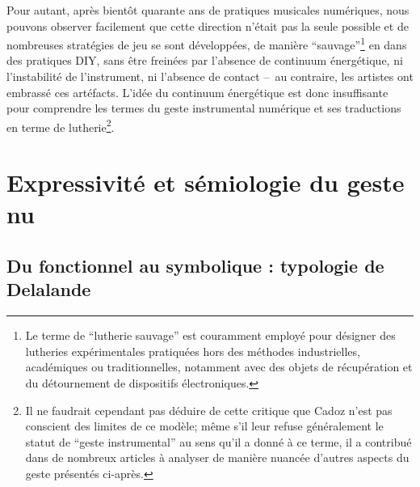 \indent Pour autant, après bientôt quarante ans de pratiques musicales numériques, nous pouvons observer facilement que cette direction n'était pas la seule possible et de nombreuses stratégies de jeu se sont développées, de manière ``sauvage''\footnote{Le terme de ``lutherie sauvage'' est couramment employé pour désigner des lutheries expérimentales pratiquées hors des méthodes industrielles, académiques ou traditionnelles, notamment avec des objets de récupération et du détournement de dispositifs électroniques.} en dans des pratiques \gls{DIY}, sans être freinées par l'absence de continuum énergétique, ni l'instabilité de l'instrument, ni l'absence de contact --~au contraire, les artistes ont embrassé ces artéfacts. L'idée du continuum énergétique est donc insuffisante pour comprendre les termes du geste instrumental numérique et ses traductions en terme de lutherie\footnote{Il ne faudrait cependant pas déduire de cette critique que Cadoz n'est pas conscient des limites de ce modèle; même s'il leur refuse généralement le statut de ``geste instrumental'' au sens qu'il a donné à ce terme, il a contribué dans de nombreux articles à analyser de manière nuancée d'autres aspects du geste présentés ci-après.}.


\section{Expressivité et sémiologie du geste nu}

\subsection{Du fonctionnel au symbolique : typologie de Delalande}

